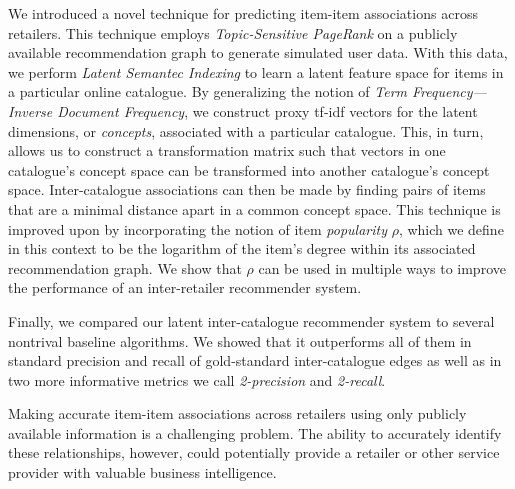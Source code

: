 \documentclass[11pt]{article}
\begin{document}
We introduced a novel technique for predicting item-item associations across
retailers. This technique employs {\em Topic-Sensitive PageRank} on a publicly
available recommendation graph to generate simulated user data. With this data,
we perform {\em Latent Semantec Indexing} to learn a latent feature space for
items in a particular online catalogue. By generalizing the notion of {\em Term
Frequency---Inverse Document Frequency}, we construct proxy tf-idf vectors for
the latent dimensions, or {\em concepts}, associated with a particular
catalogue. This, in turn, allows us to construct a transformation matrix such
that vectors in one catalogue's concept space can be transformed into another
catalogue's concept space. Inter-catalogue associations can then be made by
finding pairs of items that are a minimal distance apart in a common concept
space. This technique is improved upon by incorporating the notion of item {\em
popularity} $\rho$, which we define in this context to be the logarithm of the
item's degree within its associated recommendation graph.  We show that $\rho$
can be used in multiple ways to improve the performance of an inter-retailer
recommender system.

Finally, we compared our latent inter-catalogue recommender system to several
nontrival baseline algorithms. We showed that it outperforms all of them in
standard precision and recall of gold-standard inter-catalogue edges as well as
in two more informative metrics we call {\em 2-precision} and {\em 2-recall}.

Making accurate item-item associations across retailers using only publicly
available information is a challenging problem. The ability to accurately
identify these relationships, however, could potentially provide a retailer or
other service provider with valuable business intelligence. 
\end{document}
